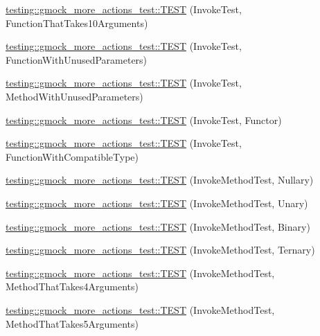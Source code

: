 \begin{DoxyCompactItemize}
\item 
\mbox{\hyperlink{namespacetesting_1_1gmock__more__actions__test_a8939ea1ccb0d8787c926c92441b27f6c}{testing\+::gmock\+\_\+more\+\_\+actions\+\_\+test\+::\+T\+E\+ST}} (Invoke\+Test, Function\+That\+Takes10\+Arguments)
\item 
\mbox{\hyperlink{namespacetesting_1_1gmock__more__actions__test_a0dd6901e637db57c56f1cf8052b6e1bf}{testing\+::gmock\+\_\+more\+\_\+actions\+\_\+test\+::\+T\+E\+ST}} (Invoke\+Test, Function\+With\+Unused\+Parameters)
\item 
\mbox{\hyperlink{namespacetesting_1_1gmock__more__actions__test_a4f48af38351403b569fc6dfae7787ed2}{testing\+::gmock\+\_\+more\+\_\+actions\+\_\+test\+::\+T\+E\+ST}} (Invoke\+Test, Method\+With\+Unused\+Parameters)
\item 
\mbox{\hyperlink{namespacetesting_1_1gmock__more__actions__test_ac56a4cb164b338d3f388ed3f4306a5a5}{testing\+::gmock\+\_\+more\+\_\+actions\+\_\+test\+::\+T\+E\+ST}} (Invoke\+Test, Functor)
\item 
\mbox{\hyperlink{namespacetesting_1_1gmock__more__actions__test_af9dfd7f1d4186ee4de2d9871a19dba5a}{testing\+::gmock\+\_\+more\+\_\+actions\+\_\+test\+::\+T\+E\+ST}} (Invoke\+Test, Function\+With\+Compatible\+Type)
\item 
\mbox{\hyperlink{namespacetesting_1_1gmock__more__actions__test_abb046fd809977722720c9ce63afd7af5}{testing\+::gmock\+\_\+more\+\_\+actions\+\_\+test\+::\+T\+E\+ST}} (Invoke\+Method\+Test, Nullary)
\item 
\mbox{\hyperlink{namespacetesting_1_1gmock__more__actions__test_a386ce48f1f0a49e2b94a16deeffc2084}{testing\+::gmock\+\_\+more\+\_\+actions\+\_\+test\+::\+T\+E\+ST}} (Invoke\+Method\+Test, Unary)
\item 
\mbox{\hyperlink{namespacetesting_1_1gmock__more__actions__test_a86221fa7d09853358e38c01b0d6ceced}{testing\+::gmock\+\_\+more\+\_\+actions\+\_\+test\+::\+T\+E\+ST}} (Invoke\+Method\+Test, Binary)
\item 
\mbox{\hyperlink{namespacetesting_1_1gmock__more__actions__test_a2b98a8a68d37a0bec600227372a1cff8}{testing\+::gmock\+\_\+more\+\_\+actions\+\_\+test\+::\+T\+E\+ST}} (Invoke\+Method\+Test, Ternary)
\item 
\mbox{\hyperlink{namespacetesting_1_1gmock__more__actions__test_af0ab6ef9fdf48e8442a5579ab27eb517}{testing\+::gmock\+\_\+more\+\_\+actions\+\_\+test\+::\+T\+E\+ST}} (Invoke\+Method\+Test, Method\+That\+Takes4\+Arguments)
\item 
\mbox{\hyperlink{namespacetesting_1_1gmock__more__actions__test_a512db122c5beadeeef026bb54aec7e45}{testing\+::gmock\+\_\+more\+\_\+actions\+\_\+test\+::\+T\+E\+ST}} (Invoke\+Method\+Test, Method\+That\+Takes5\+Arguments)

\end{DoxyCompactItemize}
